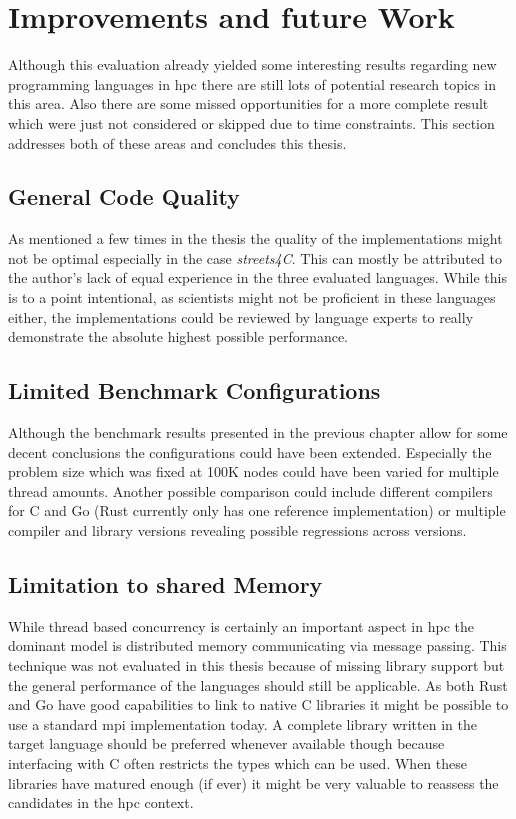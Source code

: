 \section{Improvements and future Work}
\label{sec:Conclusion::Improvements}

Although this evaluation already yielded some interesting results regarding new programming languages in \gls{hpc} there are still lots of potential research topics in this area. Also there are some missed opportunities for a more complete result which were just not considered or skipped due to time constraints. This section addresses both of these areas and concludes this thesis.

\subsection*{General Code Quality}
\label{subsec:Conclusion::Improvements::CodeQuality}

As mentioned a few times in the thesis the quality of the implementations might not be optimal especially in the case \textit{streets4C}. This can mostly be attributed to the author's lack of equal experience in the three evaluated languages. While this is to a point intentional, as scientists might not be proficient in these languages either, the implementations could be reviewed by language experts to really demonstrate the absolute highest possible performance.

\subsection*{Limited Benchmark Configurations}
\label{subsec:Conclusion::Improvements::Configuration}

Although the benchmark results presented in the previous chapter allow for some decent conclusions the configurations could have been extended. Especially the problem size which was fixed at 100K nodes could have been varied for multiple thread amounts. Another possible comparison could include different compilers for C and Go (Rust currently only has one reference implementation) or multiple compiler and library versions revealing possible regressions across versions.

\subsection*{Limitation to shared Memory}
\label{subsec:Conclusion::Improvements::SharedMemory}

While thread based concurrency is certainly an important aspect in \gls{hpc} the dominant model is distributed memory communicating via message passing. This technique was not evaluated in this thesis because of missing library support but the general performance of the languages should still be applicable. As both Rust and Go have good capabilities to link to native C libraries it might be possible to use a standard \gls{mpi} implementation today. A complete library written in the target language should be preferred whenever available though because interfacing with C often restricts the types which can be used. When these libraries have matured enough (if ever) it might be very valuable to reassess the candidates in the \gls{hpc} context.
